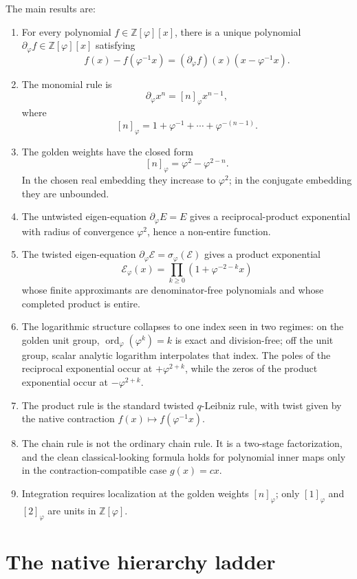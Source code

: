 \documentclass[11pt]{article}
\newcommand{\sig}{\sigma}
\newcommand{\ph}{\varphi}
\newcommand{\Z}{\mathbb{Z}}
\newcommand{\dd}{\partial_{\ph}}
\newcommand{\ord}{\operatorname{ord}}
\begin{document}
The main results are:
\begin{enumerate}[label=(\roman*)]
    \item For every polynomial $f\in \Z[\ph][x]$, there is a unique polynomial $\dd f\in\Z[\ph][x]$ satisfying
    \[
        f(x)-f(\ph^{-1}x)=(\dd f)(x)(x-\ph^{-1}x).
    \]
    \item The monomial rule is
    \[
        \dd x^n=[n]_{\ph}x^{n-1},
    \]
    where
    \[
        [n]_{\ph}=1+\ph^{-1}+\cdots+\ph^{-(n-1)}.
    \]
    \item The golden weights have the closed form
    \[
        [n]_{\ph}=\ph^2-\ph^{2-n}.
    \]
    In the chosen real embedding they increase to $\ph^2$; in the conjugate embedding they are unbounded.
    \item The untwisted eigen-equation $\dd E=E$ gives a reciprocal-product exponential with radius of convergence $\ph^2$, hence a non-entire function.
    \item The twisted eigen-equation $\dd\mathcal E=\sig_{\ph}(\mathcal E)$ gives a product exponential
    \[
        \mathcal E_{\ph}(x)=\prod_{k\ge0}(1+\ph^{-2-k}x)
    \]
    whose finite approximants are denominator-free polynomials and whose completed product is entire.
    \item The logarithmic structure collapses to one index seen in two regimes: on the golden unit group, $\ord_{\ph}(\ph^k)=k$ is exact and division-free; off the unit group, scalar analytic logarithm interpolates that index.  The poles of the reciprocal exponential occur at $+\ph^{2+k}$, while the zeros of the product exponential occur at $-\ph^{2+k}$.
    \item The product rule is the standard twisted $q$-Leibniz rule, with twist given by the native contraction $f(x)\mapsto f(\ph^{-1}x)$.
    \item The chain rule is not the ordinary chain rule.  It is a two-stage factorization, and the clean classical-looking formula holds for polynomial inner maps only in the contraction-compatible case $g(x)=cx$.
    \item Integration requires localization at the golden weights $[n]_{\ph}$; only $[1]_{\ph}$ and $[2]_{\ph}$ are units in $\Z[\ph]$.
\end{enumerate}

\section{The native hierarchy ladder}
\end{document}
